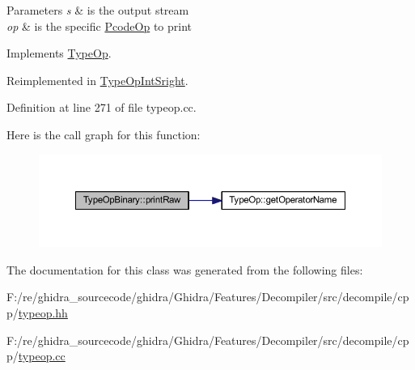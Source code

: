 \begin{DoxyParams}{Parameters}
{\em s} & is the output stream \\
\hline
{\em op} & is the specific \mbox{\hyperlink{class_pcode_op}{Pcode\+Op}} to print \\
\hline
\end{DoxyParams}


Implements \mbox{\hyperlink{class_type_op_a60717e486917a30cc7cb6e3ce02585e1}{Type\+Op}}.



Reimplemented in \mbox{\hyperlink{class_type_op_int_sright_a1559e48c6d810e3c092f3b9957528ec8}{Type\+Op\+Int\+Sright}}.



Definition at line 271 of file typeop.\+cc.

Here is the call graph for this function\+:
\nopagebreak
\begin{figure}[H]
\begin{center}
\leavevmode
\includegraphics[width=350pt]{class_type_op_binary_a3f26fc1e6bc1d143fb4f8391ef7ff3d6_cgraph}
\end{center}
\end{figure}


The documentation for this class was generated from the following files\+:\begin{DoxyCompactItemize}
\item 
F\+:/re/ghidra\+\_\+sourcecode/ghidra/\+Ghidra/\+Features/\+Decompiler/src/decompile/cpp/\mbox{\hyperlink{typeop_8hh}{typeop.\+hh}}\item 
F\+:/re/ghidra\+\_\+sourcecode/ghidra/\+Ghidra/\+Features/\+Decompiler/src/decompile/cpp/\mbox{\hyperlink{typeop_8cc}{typeop.\+cc}}\end{DoxyCompactItemize}
